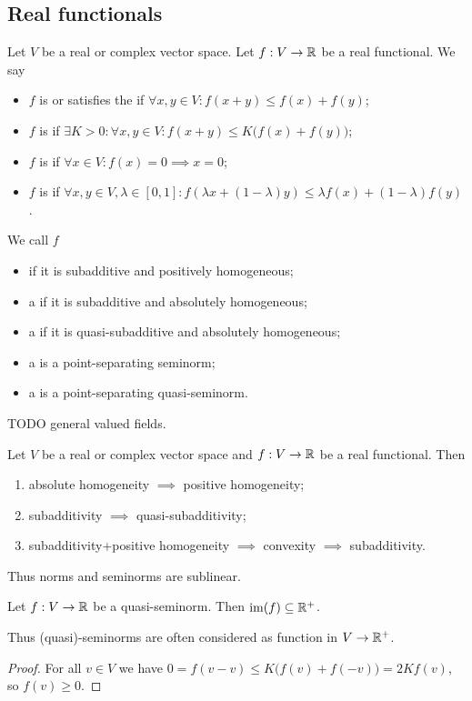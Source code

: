\subsection{Real functionals}
\begin{definition}
Let $V$ be a real or complex vector space. Let $f: V\to \mathbb{R}$ be a real functional. We say
\begin{itemize}
\item $f$ is  or satisfies the  if $\forall x,y\in V: f(x+y) \leq f(x) + f(y)$;
\item $f$ is  if $\exists K>0: \forall x,y\in V: f(x+y) \leq K\big(f(x) + f(y)\big)$;
\item $f$ is  if $\forall x\in V: f(x) = 0 \implies x = 0$;
\item $f$ is  if $\forall x,y\in V, \lambda\in[0,1]: f(\lambda x + (1-\lambda)y) \leq \lambda f(x) + (1-\lambda)f(y)$.
\end{itemize}
We call $f$
\begin{itemize}
\item {} if it is subadditive and positively homogeneous;
\item a  if it is subadditive and absolutely homogeneous;
\item a  if it is quasi-subadditive and absolutely homogeneous;
\item a  is a point-separating seminorm;
\item a  is a point-separating quasi-seminorm.
\end{itemize}
\end{definition}

TODO general valued fields.

\begin{lemma}
Let $V$ be a real or complex vector space and $f: V\to \mathbb{R}$ be a real functional. Then
\begin{enumerate}
\item absolute homogeneity $\implies$ positive homogeneity;
\item subadditivity $\implies$ quasi-subadditivity;
\item subadditivity+positive homogeneity $\implies$ convexity $\implies$ subadditivity.
\end{enumerate}
\end{lemma}
Thus norms and seminorms are sublinear.

\begin{lemma} \label{seminormPositivity}
Let $f:V\to \mathbb{R}$ be a quasi-seminorm. Then $\operatorname{im}(f)\subseteq \mathbb{R}^+$.
\end{lemma}
Thus (quasi)-seminorms are often considered as function in $V\to \mathbb{R}^+$.
\begin{proof}
For all $v\in V$ we have $0 = f(v-v) \leq K\big(f(v)+f(-v)\big) = 2Kf(v)$, so $f(v) \geq 0$.
\end{proof}

